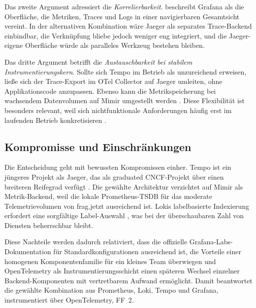 Das zweite Argument adressiert die \emph{Korrelierbarkeit}. \textcite[S.~16]{sundstrom2025finding} beschreibt Grafana als die Oberfläche, die Metriken, Traces und Logs in einer navigierbaren Gesamtsicht vereint. In der alternativen Kombination wäre Jaeger als separates Trace-Backend einbindbar, die Verknüpfung bliebe jedoch weniger eng integriert, und die Jaeger-eigene Oberfläche würde als paralleles Werkzeug bestehen bleiben.

Das dritte Argument betrifft die \emph{Austauschbarkeit bei stabilem Instrumentierungskern}. Sollte sich Tempo im Betrieb als unzureichend erweisen, ließe sich der Trace-Export im OTel Collector auf Jaeger umleiten, ohne Applikationscode anzupassen. Ebenso kann die Metrikspeicherung bei wachsendem Datenvolumen auf Mimir umgestellt werden \parencite[S.~502]{gudimetla2025transitioning}. Diese Flexibilität ist besonders relevant, weil sich nichtfunktionale Anforderungen häufig erst im laufenden Betrieb konkretisieren \parencite[S.~9--10]{Niedermaier2019onObservability}.


\subsection{Kompromisse und Einschränkungen}

Die Entscheidung geht mit bewussten Kompromissen einher. Tempo ist ein jüngeres Projekt als Jaeger, das als graduated CNCF-Projekt über einen breiteren Reifegrad verfügt \parencite[S.~15]{giamattei2024monitoring}. Die gewählte Architektur verzichtet auf Mimir als Metrik-Backend, weil die lokale Prometheus-TSDB für das moderate Telemetrievolumen von frag.jetzt ausreichend ist. Lokis labelbasierte Indexierung erfordert eine sorgfältige Label-Auswahl \parencite{grafana_loki_docs}, was bei der überschaubaren Zahl von Diensten beherrschbar bleibt.

Diese Nachteile werden dadurch relativiert, dass die offizielle Grafana-Labs-Dokumentation für Standardkonfigurationen ausreichend ist, die Vorteile einer homogenen Komponentenfamilie für ein kleines Team überwiegen und OpenTelemetry als Instrumentierungsschicht einen späteren Wechsel einzelner Backend-Komponenten mit vertretbarem Aufwand ermöglicht. Damit beantwortet die gewählte Kombination aus Prometheus, Loki, Tempo und Grafana, instrumentiert über OpenTelemetry, FF~2.